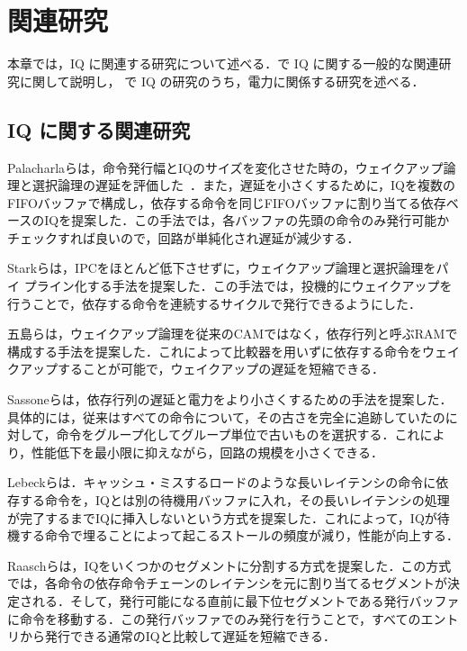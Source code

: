 
\chapter{関連研究}
\label{sec:related_work}
本章では，IQ に関連する研究について述べる．で IQ に関する一般的な関連研究に関して説明し， で IQ の研究のうち，電力に関係する研究を述べる．

\section{IQ に関する関連研究}
\label{sec:relate_IQ}
Palacharlaらは，命令発行幅とIQのサイズを変化させた時の，ウェイクアップ論理と選択論理の遅延を評価した~\cite{Palacharla1997}．また，遅延を小さくするために，IQを複数のFIFOバッファで構成し，依存する命令を同じFIFOバッファに割り当てる依存ベースのIQを提案した．この手法では，各バッファの先頭の命令のみ発行可能かチェックすれば良いので，回路が単純化され遅延が減少する．

Starkらは，IPCをほとんど低下させずに，ウェイクアップ論理と選択論理をパイ
プライン化する手法を提案した\cite{Stark2000}．この手法では，投機的にウェイクアップを行うことで，依存する命令を連続するサイクルで発行できるようにした．

五島らは，ウェイクアップ論理を従来のCAMではなく，依存行列と呼ぶRAMで構成する手法を提案した\cite{goshima2001}．これによって比較器を用いずに依存する命令をウェイクアップすることが可能で，ウェイクアップの遅延を短縮できる．

Sassoneらは，依存行列の遅延と電力をより小さくするための手法を提案した\cite{sassone2007}．具体的には，従来はすべての命令について，その古さを完全に追跡していたのに対して，命令をグループ化してグループ単位で古いものを選択する．これにより，性能低下を最小限に抑えながら，回路の規模を小さくできる．

Lebeckらは．キャッシュ・ミスするロードのような長いレイテンシの命令に依存する命令を，IQとは別の待機用バッファに入れ，その長いレイテンシの処理が完了するまでIQに挿入しないという方式を提案した\cite{Lebeck2002}．これによって，IQが待機する命令で埋ることによって起こるストールの頻度が減り，性能が向上する．

Raaschらは，IQをいくつかのセグメントに分割する方式を提案した\cite{Raasch2002}．この方式では，各命令の依存命令チェーンのレイテンシを元に割り当てるセグメントが決定される．そして，発行可能になる直前に最下位セグメントである発行バッファに命令を移動する．この発行バッファでのみ発行を行うことで，すべてのエントリから発行できる通常のIQと比較して遅延を短縮できる．

